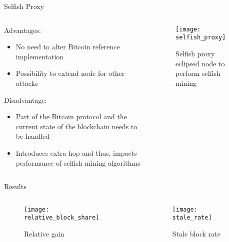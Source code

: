 \documentclass[final,hyperref={pdfpagelabels=true}]{beamer}
\begin{document}
\begin{frame}
\begin{block}{Selfish Proxy}
\begin{columns}[t]
\begin{column}{.45\textwidth}
     		\bigskip
     		Advantages:
     		\begin{itemize}
     			\item No need to alter Bitcoin reference implementation
     			\item Possibility to extend node for other attacks
			\end{itemize}
     		Disadvantage:
     		\begin{itemize}
     			\item Part of the Bitcoin protocol and the current state of the blockchain needs to be handled
     			\item Introduces extra hop and thus, impacts performance of selfish mining algorithms
			\end{itemize}   			
    	\end{column}
 	
        \begin{column}{.45\textwidth}
        	\begin{figure}[t]
            	\texttt{[image: selfish\_proxy]}
            	\centering
            	\caption{Selfish proxy eclipsed node to perform selfish mining}
        	\end{figure} 
    	\end{column}
    	
  	\end{columns}
  \end{block}

  \begin{columns}[t]

    \begin{column}{.55\textwidth}
      \begin{block}{Results}
		
		\begin{columns}[t]

    		\begin{column}{.45\textwidth}
        		\begin{figure}[t]
            		\texttt{[image: relative\_block\_share]}
            		\centering
            		\caption{Relative gain}
        		\end{figure}
    		\end{column}

    		\begin{column}{.45\textwidth}
        		\begin{figure}[t]
            		\texttt{[image: stale\_rate]}
            		\centering
            		\caption{Stale block rate}
        		\end{figure}
    		\end{column}


\end{columns}
\end{block}
\end{column}
\end{columns}
\end{frame}
\end{document}
